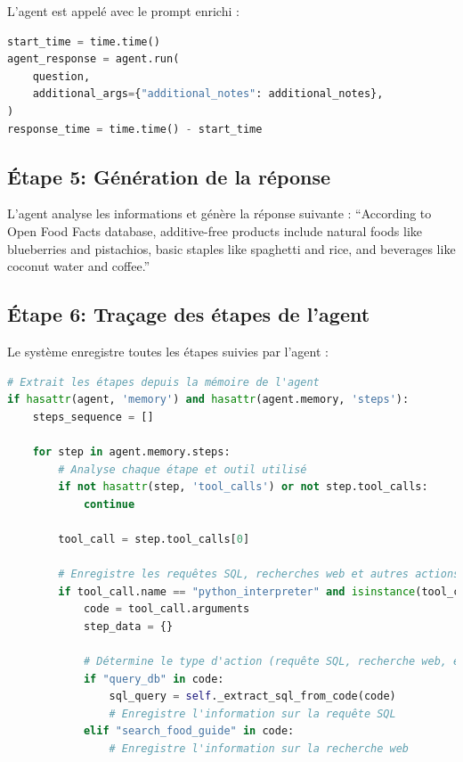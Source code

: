 \documentclass[a4paper,11pt]{article}
\begin{document}
L'agent est appelé avec le prompt enrichi :

\begin{lstlisting}[language=Python, caption=Exécution
de l'agent avec les notes additionnelles]
start_time = time.time()
agent_response = agent.run(
    question,
    additional_args={"additional_notes": additional_notes},
)
response_time = time.time() - start_time
\end{lstlisting}

\subsection*{Étape 5: Génération de la réponse}

L'agent analyse les informations et génère la réponse suivante : 
\enquote{According to Open Food Facts database, additive-free products include natural 
foods like blueberries and pistachios, basic staples like spaghetti and rice, 
and beverages like coconut water and coffee.}

\newpage
\subsection*{Étape 6: Traçage des étapes de l'agent}

Le système enregistre toutes les étapes suivies par l'agent :

\begin{lstlisting}[language=Python, caption=Traçage des étapes de l'agent]
# Extrait les étapes depuis la mémoire de l'agent
if hasattr(agent, 'memory') and hasattr(agent.memory, 'steps'):
    steps_sequence = []
    
    for step in agent.memory.steps:
        # Analyse chaque étape et outil utilisé
        if not hasattr(step, 'tool_calls') or not step.tool_calls:
            continue
            
        tool_call = step.tool_calls[0]
        
        # Enregistre les requêtes SQL, recherches web et autres actions
        if tool_call.name == "python_interpreter" and isinstance(tool_call.arguments, str):
            code = tool_call.arguments
            step_data = {}
            
            # Détermine le type d'action (requête SQL, recherche web, etc.)
            if "query_db" in code:
                sql_query = self._extract_sql_from_code(code)
                # Enregistre l'information sur la requête SQL
            elif "search_food_guide" in code:
                # Enregistre l'information sur la recherche web
\end{lstlisting}
\end{document}
